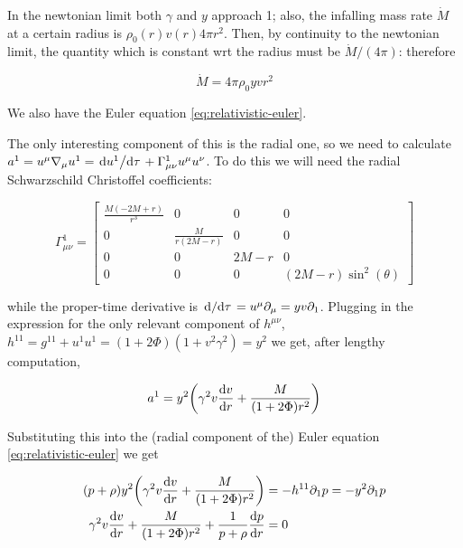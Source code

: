 \documentclass[main.tex]{subfiles}
\begin{document}
In the newtonian limit both $\gamma$ and $y$ approach 1; also, the infalling mass rate $\Dot{M}$ at a certain radius is $\rho_0 (r) v(r) 4\pi r^2$. Then, by continuity to the newtonian limit, the quantity which is constant wrt the radius must be $\Dot{M} / (4\pi)$: therefore

\begin{equation} \label{eq:mass-conservation-integral}
  \dot{M} = 4 \pi\rho_0 yvr^2
\end{equation}

We also have the Euler equation \eqref{eq:relativistic-euler}.

The only interesting component of this is the radial one, so we need to calculate \(a^1 = u^\mu \nabla_\mu u^1 = \dv*{u^1}{\tau} + \Gamma^1_{\mu \nu} u^\mu u^\nu \). To do this we will need the radial Schwarzschild Christoffel coefficients:

\begin{equation}
  \Gamma^1_{\mu \nu} = \left[\begin{matrix}\frac{M \left(- 2 M + r\right)}{r^{3}} & 0 & 0 & 0\\0 & \frac{M}{r \left(2 M - r\right)} & 0 & 0\\0 & 0 & 2 M - r & 0\\0 & 0 & 0 & \left(2 M - r\right) \sin^{2}{\left(\theta \right)}\end{matrix}\right]
\end{equation}

while the proper-time derivative is \(\dv*{}{\tau} = u^\mu \partial_\mu = yv\partial_1\).
Plugging in the expression for the only relevant component of \(h^{\mu\nu}\), \(h^{11} = g^{11} + u^1 u^1 = (1 + 2 \Phi) (1 + v^2 \gamma^2) = y^2\)
we get, after lengthy computation,

\begin{equation}
  a^1 = y^2 \qty(\gamma^2 v \dv{v}{r} + \frac{M}{(1+ 2 \Phi) r^2})
\end{equation}

Substituting this into the (radial component of the) Euler equation \eqref{eq:relativistic-euler} we get

\begin{subequations}
\begin{align}
  (p + \rho) y^2 \qty(\gamma^2 v \dv{v}{r} + \frac{M}{(1+ 2 \Phi) r^2}) &= - h^{1 1} \partial_1 p = - y^2 \partial_1 p \\
   \gamma^2 v \dv{v}{r} + \frac{M}{(1+ 2 \Phi) r^2} + \frac{1}{p + \rho} \dv{p}{r} &= 0
  \label{eq:ideal-euler}
\end{align}
\end{subequations}
\end{document}
